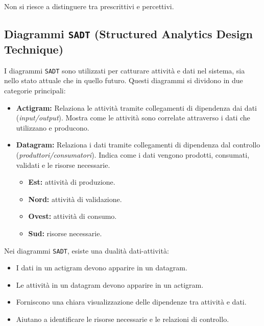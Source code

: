 \begin{tcolorbox}[colback=red!5!white,colframe=red!75!black,title=Svantaggi dei
    Diagrammi Entità-Relazione]
    Non si riesce a distinguere tra prescrittivi e percettivi.
\end{tcolorbox}
\subsection{Diagrammi \texttt{SADT} (Structured Analytics Design Technique)}
I diagrammi \texttt{SADT} sono utilizzati per catturare attività e dati nel sistema, sia nello stato attuale che in quello futuro. Questi diagrammi si dividono in due categorie principali:

\begin{itemize}
    \item \textbf{Actigram:} Relaziona le attività tramite collegamenti di
    dipendenza dai dati (\textit{input/output}). Mostra come le attività sono correlate
    attraverso i dati che utilizzano e producono.
    \item \textbf{Datagram:} Relaziona i dati tramite collegamenti di dipendenza
    dal controllo (\textit{produttori/consumatori}). Indica come i dati vengono prodotti,
    consumati, validati e le risorse necessarie.
    \begin{itemize}
        \item \textbf{Est:} attività di produzione.
        \item \textbf{Nord:} attività di validazione.
        \item \textbf{Ovest:} attività di consumo.
        \item \textbf{Sud:} risorse necessarie.
    \end{itemize}
\end{itemize}

Nei diagrammi \texttt{SADT}, esiste una dualità dati-attività:
\begin{itemize}
    \item I dati in un actigram devono apparire in un datagram.
    \item Le attività in un datagram devono apparire in un actigram.
\end{itemize}

\begin{tcolorbox}[colback=green!5!white,colframe=green!75!black,title=Vantaggi dei
    Diagrammi \texttt{SADT}]
    \begin{itemize}
        \item Forniscono una chiara visualizzazione delle dipendenze tra attività e dati.
        \item Aiutano a identificare le risorse necessarie e le relazioni di controllo.
    \end{itemize}
\end{tcolorbox}

